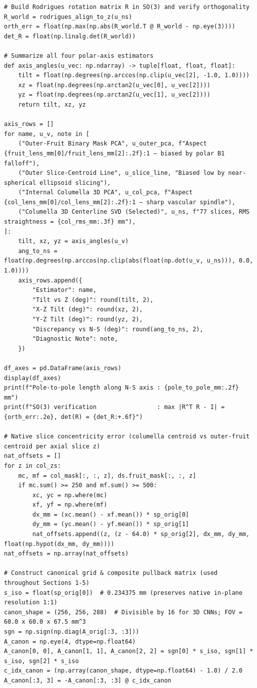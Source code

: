 \documentclass[10pt,a4paper]{article}
\renewcommand{\_}{\origunderscore\allowbreak}
\begin{document}
\begin{codebox}
\begin{lstlisting}[style=pybmed]
# Build Rodrigues rotation matrix R in SO(3) and verify orthogonality
R_world = rodrigues_align_to_z(u_ns)
orth_err = float(np.max(np.abs(R_world.T @ R_world - np.eye(3))))
det_R = float(np.linalg.det(R_world))

# Summarize all four polar-axis estimators
def axis_angles(u_vec: np.ndarray) -> tuple[float, float, float]:
    tilt = float(np.degrees(np.arccos(np.clip(u_vec[2], -1.0, 1.0))))
    xz = float(np.degrees(np.arctan2(u_vec[0], u_vec[2])))
    yz = float(np.degrees(np.arctan2(u_vec[1], u_vec[2])))
    return tilt, xz, yz

axis_rows = []
for name, u_v, note in [
    ("Outer-Fruit Binary Mask PCA", u_outer_pca, f"Aspect {fruit_lens_mm[0]/fruit_lens_mm[2]:.2f}:1 — biased by polar B1 falloff"),
    ("Outer Slice-Centroid Line", u_slice_line, "Biased low by near-spherical ellipsoid slicing"),
    ("Internal Columella 3D PCA", u_col_pca, f"Aspect {col_lens_mm[0]/col_lens_mm[2]:.2f}:1 — sharp vascular spindle"),
    ("Columella 3D Centerline SVD (Selected)", u_ns, f"77 slices, RMS straightness = {col_rms_mm:.3f} mm"),
]:
    tilt, xz, yz = axis_angles(u_v)
    ang_to_ns = float(np.degrees(np.arccos(np.clip(abs(float(np.dot(u_v, u_ns))), 0.0, 1.0))))
    axis_rows.append({
        "Estimator": name,
        "Tilt vs Z (deg)": round(tilt, 2),
        "X-Z Tilt (deg)": round(xz, 2),
        "Y-Z Tilt (deg)": round(yz, 2),
        "Discrepancy vs N-S (deg)": round(ang_to_ns, 2),
        "Diagnostic Note": note,
    })

df_axes = pd.DataFrame(axis_rows)
display(df_axes)
print(f"Pole-to-pole length along N-S axis : {pole_to_pole_mm:.2f} mm")
print(f"SO(3) verification                 : max |R^T R - I| = {orth_err:.2e}, det(R) = {det_R:+.6f}")

# Native slice concentricity error (columella centroid vs outer-fruit centroid per axial slice z)
nat_offsets = []
for z in col_zs:
    mc, mf = col_mask[:, :, z], ds.fruit_mask[:, :, z]
    if mc.sum() >= 250 and mf.sum() >= 500:
        xc, yc = np.where(mc)
        xf, yf = np.where(mf)
        dx_mm = (xc.mean() - xf.mean()) * sp_orig[0]
        dy_mm = (yc.mean() - yf.mean()) * sp_orig[1]
        nat_offsets.append((z, (z - 64.0) * sp_orig[2], dx_mm, dy_mm, float(np.hypot(dx_mm, dy_mm))))
nat_offsets = np.array(nat_offsets)

# Construct canonical grid & composite pullback matrix (used throughout Sections 1-5)
s_iso = float(sp_orig[0])  # 0.234375 mm (preserves native in-plane resolution 1:1)
canon_shape = (256, 256, 288)  # Divisible by 16 for 3D CNNs; FOV = 60.0 x 60.0 x 67.5 mm^3
sgn = np.sign(np.diag(A_orig[:3, :3]))
A_canon = np.eye(4, dtype=np.float64)
A_canon[0, 0], A_canon[1, 1], A_canon[2, 2] = sgn[0] * s_iso, sgn[1] * s_iso, sgn[2] * s_iso
c_idx_canon = (np.array(canon_shape, dtype=np.float64) - 1.0) / 2.0
A_canon[:3, 3] = -A_canon[:3, :3] @ c_idx_canon


\end{lstlisting}
\end{codebox}
\end{document}
